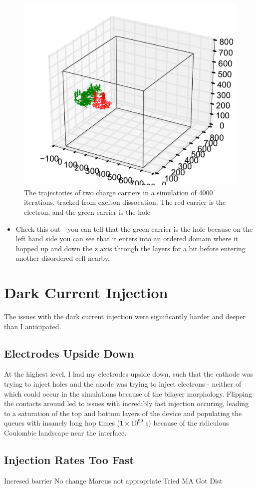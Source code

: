 \documentclass[12pt]{article}
\begin{document}
\begin{figure}[h!]\centering
	\includegraphics[width=\textwidth]{Figures/3d_trajectory.pdf}
    \caption{The trajectories of two charge carriers in a simulation of 4000 iterations, tracked from exciton dissocation. The red carrier is the electron, and the green carrier is the hole}
	\label{fig:3dTrajectory}
\end{figure}


\begin{itemize}
    \item{Check this out - you can tell that the green carrier is the hole because on the left hand side you can see that it enters into an ordered domain where it hopped up and down the z axis through the layers for a bit before entering another disordered cell nearby.}
\end{itemize}

\clearpage

\section{Dark Current Injection}

The issues with the dark current injection were significantly harder and deeper than I anticipated.

\subsection{Electrodes Upside Down}
At the highest level, I had my electrodes upside down, such that the cathode was trying to inject holes and the anode was trying to inject electrons - neither of which could occur in the simulations because of the bilayer morphology.
Flipping the contacts around led to issues with incredibly fast injection occuring, leading to a saturation of the top and bottom layers of the device and populating the queues with insanely long hop times ($1 \times 10^{99}$ s) because of the ridiculous Coulombic landscape near the interface.


\subsection{Injection Rates Too Fast}
Incresed barrier
No change
Marcus not appropriate
Tried MA
Got Dist



\end{document}
